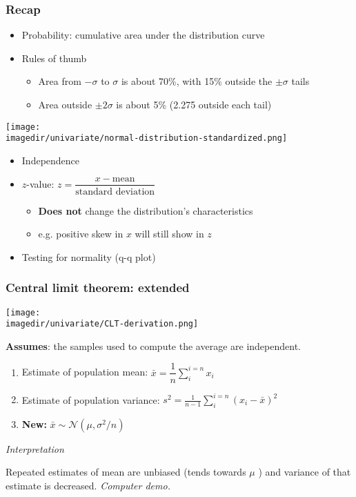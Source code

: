 \begin{frame}\frametitle{Recap}
	\begin{itemize}
		\item	Probability: cumulative area under the distribution curve
		\item	Rules of thumb
		\begin{itemize}
			\item	Area from $-\sigma$ to $\sigma$ is about 70\%, with 15\% outside the $\pm \sigma$ tails
			\item	Area outside $\pm 2\sigma$ is about 5\% (2.275 outside each tail)
		\end{itemize}
	\end{itemize}
	\begin{center}
		\texttt{[image: \\imagedir/univariate/normal-distribution-standardized.png]}
	\end{center}
	\vspace{-16pt}
	\begin{itemize}
		\item	Independence
		\item	$z$-value: $z = \dfrac{x - \text{mean}}{\text{standard deviation}}$
		\vspace{8pt}
		\begin{itemize}
			\item	\textbf{Does not} change the distribution's characteristics
			\item	e.g. positive skew in $x$ will still show in $z$
		\end{itemize}
		\item	Testing for normality (q-q plot)
	\end{itemize}
\end{frame}

\begin{frame}\frametitle{Central limit theorem: extended}

	\texttt{[image: \\imagedir/univariate/CLT-derivation.png]}

	\textbf{Assumes}: the samples used to compute the average are independent.
	\begin{enumerate}
		\item	Estimate of population mean: $\bar{x} = \displaystyle \dfrac{1}{n} \sum_i^{i=n}{x_i}$
		\item	Estimate of population variance: $s^2 =\displaystyle \frac{1}{n-1}\sum_i^{i=n}{(x_i - \bar{x})^2}$
		\item	\textbf{New:} $\bar{x} \sim \mathcal{N}\left(\mu, \sigma^2/n \right)$  \hfill{\color{myGreen}{$\longleftarrow$ really powerful statement}}
	\end{enumerate}

	\emph{Interpretation}

	Repeated estimates of mean are unbiased (tends towards $\mu$ {\color{myOrange}{$\leftarrow$ of the distribution sampled from!}}) and variance of that estimate is decreased. 
	\emph{Computer demo.}
	
\end{frame}

